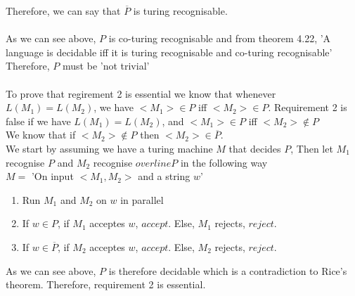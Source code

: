 \documentclass[a4paper,12pt]{article}
\begin{document}
\begin{enumerate}
Therefore, we can say that $\overline{P}$ is turing recognisable. \\
\\
As we can see above, $P$ is co-turing recognisable and from theorem 4.22, 'A language is decidable iff it is turing recognisable and co-turing recognisable' Therefore, $P$ must be 'not trivial' \\
\\
To prove that regirement 2 is essential we know that whenever $L(M_1) = L(M_2)$, we have $<M_1> \in P$ iff $<M_2> \in P$. Requirement 2 is false if we have $L(M_1) = L(M_2)$, and $<M_1> \in P$ iff $<M_2> \notin P$ \\
We know that if $<M_2> \notin P$ then $<M_2> \in \overline{P}$. \\
We start by assuming we have a turing machine $M$ that decides $P$, Then let $M_1$ recognise $P$ and $M_2$ recognise $overline{P}$ in the following way \\
$M = $ 'On input $<M_1, M_2>$ and a string $w$'
\begin{enumerate}[label=\arabic*)]
\item Run $M_1$ and $M_2$ on $w$ in parallel
\item If $w \in P$, if $M_1$ acceptes $w$, $accept$. Else, $M_1$ rejects, $reject$.
\item If $w \in \overline{P}$, if $M_2$ acceptes $w$, $accept$. Else, $M_2$ rejects, $reject$.
\end{enumerate}
As we can see above, $P$ is therefore decidable which is a contradiction to Rice's theorem. Therefore, requirement 2 is essential. 
\end{enumerate}
\end{document}
